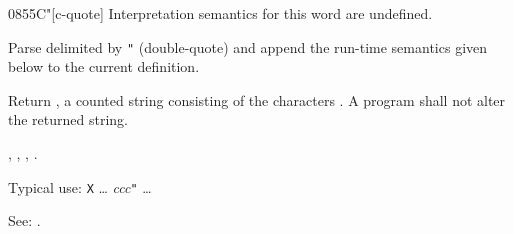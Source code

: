 \begin{worddef}[Cq]{0855}{C"}[c-quote]
\interpret
	Interpretation semantics for this word are undefined.

\compile

	Parse  delimited by \texttt{"} (double-quote) and
	append the run-time semantics given below to the current
	definition.

\runtime

	Return , a counted string consisting of the
	characters . A program shall not alter the returned
	string.

\see {},
	,
	,
	.

	\begin{rationale} %
		Typical use:
			\word{:} \texttt{X} {\ldots}
				 \emph{ccc}\texttt{"}
			{\ldots} \word{;}

		See: .
	\end{rationale}

	\begin{testing}
		 \\
		 \\
		 \\
	\end{testing}
\end{worddef}


